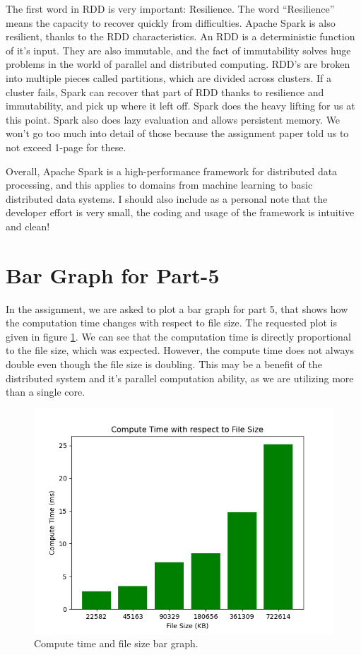 \documentclass[12pt,reqno]{amsart}
\begin{document}
The first word in RDD is very important: Resilience. The word ``Resilience'' means the capacity to recover quickly from difficulties. Apache Spark is also resilient, thanks to the RDD characteristics. An RDD is a deterministic function of it's input. They are also immutable, and the fact of immutability solves huge problems in the world of parallel and distributed computing. RDD's are broken into multiple pieces called partitions, which are divided across clusters. If a cluster fails, Spark can recover that part of RDD thanks to resilience and immutability, and pick up where it left off. Spark does the heavy lifting for us at this point. Spark also does lazy evaluation and allows persistent memory. We won't go too much into detail of those because the assignment paper told us to not exceed 1-page for these. 

Overall, Apache Spark is a high-performance framework for distributed data processing, and this applies to domains from machine learning to basic distributed data systems. I should also include as a personal note that the developer effort is very small, the coding and usage of the framework is intuitive and clean!

\section{Bar Graph for Part-5}

In the assignment, we are asked to plot a bar graph for part 5, that shows how the computation time changes with respect to file size. The requested plot is given in figure \ref{fig:1}. We can see that the computation time is directly proportional to the file size, which was expected. However, the compute time does not always double even though the file size is doubling. This may be a benefit of the distributed system and it's parallel computation ability, as we are utilizing more than a single core.
\begin{figure}[h]
\centering
\includegraphics[width=0.9\linewidth]{plot.png}
\caption{Compute time and file size bar graph.}
\label{fig:1}
\end{figure}
\end{document}
